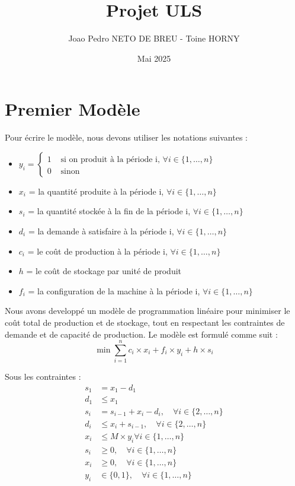 \documentclass[a4paper,12pt]{article}
\title{Projet ULS}
\author{Joao Pedro NETO DE BREU - Toine HORNY}
\date{Mai 2025}
\theoremstyle{blueDefinition}
\theoremstyle{redProperty}
\begin{document}
\maketitle

\section{Premier Modèle}

Pour écrire le modèle, nous devons utiliser les notations suivantes :
\begin{itemize}
    \item $ y_i = \begin{cases}
        1 & \text{ si on produit à la période i, } \forall i \in \{1, \dots, n\} \\
        0 & \text{ sinon}
    \end{cases}$
    \item $x_i$ = la quantité produite à la période i, $\forall i \in \{1, \dots, n\}$
    \item $s_i$ = la quantité stockée à la fin de la période i, $\forall i \in \{1, \dots, n\}$
    \item $d_i$ = la demande à satisfaire à la période i, $\forall i \in \{1, \dots, n\}$
    \item $c_i$ = le coût de production à la période i, $\forall i \in \{1, \dots, n\}$
    \item $h$ = le coût de stockage par unité de produit
    \item $f_i$ = la configuration de la machine à la période i, $\forall i \in \{1, \dots, n\}$
\end{itemize}

\vspace{10pt}

Nous avons developpé un modèle de programmation linéaire pour minimiser le coût total de production et de stockage, tout en respectant les contraintes de demande et de capacité de production. Le modèle est formulé comme suit :
\begin{equation}
    \min \sum_{i=1}^{n} c_i \times x_i + f_i \times y_i + h \times s_i 
\end{equation}

Sous les contraintes :
\begin{align}
    s_1 &= x_1 - d_1 \\
    d_1 &\leq x_1 \\
    s_i &= s_{i-1} + x_i - d_i, \quad \forall i \in \{2, \dots, n\} \\
    d_i &\leq x_i + s_{i-1}, \quad \forall i \in \{2, \dots, n\} \\
    x_i &\leq M \times y_i \forall i \in \{1, \dots, n\} \label{eq:BigM} \\
    s_i &\geq 0, \quad \forall i \in \{1, \dots, n\} \\
    x_i &\geq 0, \quad \forall i \in \{1, \dots, n\} \\
    y_i &\in \{0, 1\}, \quad \forall i \in \{1, \dots, n\} \\
\end{align}
\end{document}
